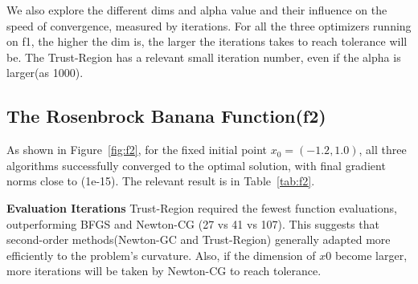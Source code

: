 \documentclass[12pt]{article}
\begin{document}
We also explore the different dims and alpha value and their influence on the speed of convergence, measured by iterations. For all the three optimizers running on f1, the higher the dim is, the larger the iterations takes to reach tolerance will be. The Trust-Region has a relevant small iteration number, even if the alpha is larger(as 1000).


\subsection{The Rosenbrock Banana Function(f2)}

As shown in Figure~\ref{fig:f2}, for the fixed initial point $x_0=(-1.2,1.0)$, all three algorithms successfully converged to the optimal solution, with final gradient norms close to (1e-15). The relevant result is in Table~\ref{tab:f2}.


\textbf{Evaluation Iterations}  
Trust-Region required the fewest function evaluations, outperforming BFGS and Newton-CG (27 vs 41 vs 107). This suggests that second-order methods(Newton-GC and Trust-Region) generally adapted more efficiently to the problem’s curvature. Also, if the dimension of $x0$ become larger, more iterations will be taken by Newton-CG to reach tolerance.


\begin{table}[h]
    \centering
    \caption{Optimization results for the Rosenbrock Banana Function.}
    \label{tab:f2}
\end{table}
\end{document}
